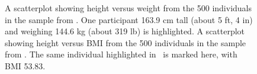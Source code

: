 \begin{figure}[h]
	\centering
    \caption{ A scatterplot showing height versus weight from the 500 individuals in the sample from . One participant 163.9 cm tall (about 5 ft, 4 in) and weighing 144.6 kg (about 319 lb) is highlighted.  A scatterplot showing height versus BMI from the 500 individuals in the sample from . The same individual highlighted in~ is marked here, with BMI 53.83.}\label{hanesHeightWeightBmi} 
\end{figure}




